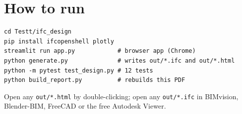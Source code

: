 \documentclass[11pt]{article}
\begin{document}
\section{How to run}
\begin{verbatim}
cd Testt/ifc_design
pip install ifcopenshell plotly
streamlit run app.py            # browser app (Chrome)
python generate.py              # writes out/*.ifc and out/*.html
python -m pytest test_design.py # 12 tests
python build_report.py          # rebuilds this PDF
\end{verbatim}
Open any \texttt{out/*.html} by double-clicking; open any \texttt{out/*.ifc} in BIMvision, Blender-BIM, FreeCAD or the free Autodesk Viewer.
\end{document}
